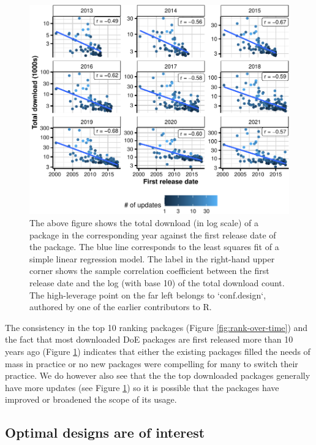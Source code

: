 \documentclass{article}
\begin{document}
\begin{figure}[htbp]

{\centering \includegraphics{figures/release-date-vs-download-1} 

}

\caption{The above figure shows the total download (in log scale) of a package in the corresponding year against the first release date of the package. The blue line corresponds to the least squares fit of a simple linear regression model. The label in the right-hand upper corner shows the sample correlation coefficient between the first release date and the log (with base 10) of the total download count. The high-leverage point on the far left belongs to `conf.design`, authored by one of the earlier contributors to R.}\label{fig:release-date-vs-download}
\end{figure}

The consistency in the top 10 ranking packages (Figure
\ref{fig:rank-over-time}) and the fact that most downloaded DoE packages
are first released more than 10 years ago (Figure
\ref{fig:release-date-vs-download}) indicates that either the existing
packages filled the needs of mass in practice or no new packages were
compelling for many to switch their practice. We do however also see
that the the top downloaded packages generally have more updates (see
Figure \ref{fig:release-date-vs-download}) so it is possible that the
packages have improved or broadened the scope of its usage.

\hypertarget{topics}{%
\subsection{Optimal designs are of interest}\label{topics}}
\end{document}
